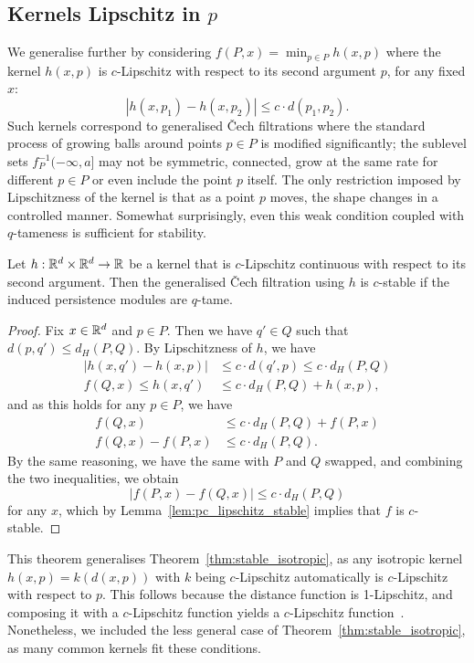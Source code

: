 \subsection{Kernels Lipschitz in $p$}

We generalise further by considering $f(P, x) = \min_{p \in P} h(x, p)$
where the kernel $h(x, p)$ is $c$-Lipschitz with respect to its second argument
$p$, for any fixed $x$:
\begin{equation}
    |h(x, p_1) - h(x, p_2)| \leq c \cdot d(p_1, p_2).
\end{equation}
Such kernels correspond to generalised \v{C}ech filtrations where the standard
process of growing balls around points $p \in P$ is modified significantly;
the sublevel sets $f_P^{-1}(-\infty, a]$ may not be symmetric, connected, grow
at the same rate for different $p \in P$ or even include the point $p$ itself.
The only restriction imposed by Lipschitzness of the kernel is that as a point
$p$ moves, the shape changes in a controlled manner. Somewhat surprisingly, even
this weak condition coupled with $q$-tameness is sufficient for stability.
\begin{theorem}
    Let $h : \mathbb{R}^d \times \mathbb{R}^d \to \mathbb{R}$ be a kernel that is $c$-Lipschitz
    continuous with respect to its second argument. Then the generalised
    \v{C}ech filtration using $h$ is $c$-stable if the induced persistence
    modules are $q$-tame.
\end{theorem}
\begin{proof}
    Fix $x \in \mathbb{R}^d$ and $p \in P$. Then we have $q' \in Q$ such that $d(p, q')
    \leq d_H(P, Q)$. By Lipschitzness of $h$, we have
    \begin{align}
        |h(x, q') - h(x, p)| & \leq c \cdot d(q', p) \leq c \cdot d_H(P, Q) \\
        f(Q, x) \leq h(x, q') & \leq c \cdot d_H(P, Q) + h(x, p),
    \end{align}
    and as this holds for any $p \in P$, we have
    \begin{align}
        f(Q, x) & \leq c \cdot d_H(P, Q) + f(P, x) \\
        f(Q, x) - f(P, x) & \leq c \cdot d_H(P, Q).
    \end{align}
    By the same reasoning, we have the same with $P$ and $Q$ swapped,
    and combining the two inequalities, we obtain
    \begin{equation}
        |f(P, x) - f(Q, x)| \leq c \cdot d_H(P, Q)
    \end{equation}
    for any $x$, which by Lemma~\ref{lem:pc_lipschitz_stable} implies that
    $f$ is $c$-stable.
\end{proof}
This theorem generalises Theorem~\ref{thm:stable_isotropic},
as any isotropic kernel $h(x, p) = k(d(x, p))$ with $k$ being $c$-Lipschitz
automatically is $c$-Lipschitz with respect to $p$. This follows because the
distance function is 1-Lipschitz, and composing it with a $c$-Lipschitz function
yields a $c$-Lipschitz function~\cite{weaver2018lipschitz}.
Nonetheless, we included the less general case of
Theorem~\ref{thm:stable_isotropic}, as many common kernels fit these conditions.

